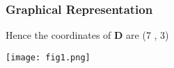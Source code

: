 \documentclass{beamer}
\begin{document}
\begin{frame}
\frametitle{Graphical Representation}
Hence the coordinates of \textbf{D} are (7 , 3)
\begin{center}
\texttt{[image: fig1.png]}
\end{center}
\end{frame}
\end{document}
